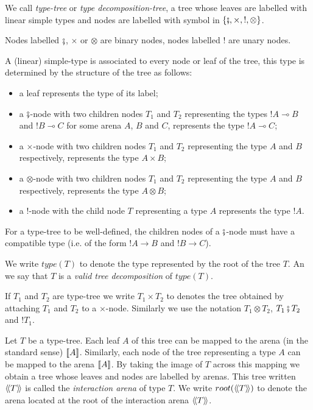 \begin{dfn}
We call \emph{type-tree} or \emph{type decomposition-tree}, a tree whose leaves are labelled with linear simple types
and nodes are labelled with symbol in  $\{ \fatsemi, \times, !, \otimes \}$.

Nodes labelled $\fatsemi$, $\times$ or $\otimes$ are binary nodes, nodes labelled $!$ are unary nodes.

A (linear) simple-type is associated to every node or leaf of the tree, this type is determined by the
structure of the tree as follows:
\begin{itemize}
\item a leaf represents the type of its label;
\item a $\fatsemi$-node with two children nodes $T_1$ and $T_2$ representing the types $!A\multimap B$
and $!B \multimap C$ for some arena $A$, $B$ and $C$, represents the type $!A \multimap C$;

\item a $\times$-node with two children nodes $T_1$ and $T_2$ representing the type $A$
and $B$ respectively, represents the type $A \times B$;

\item a $\otimes$-node with two children nodes $T_1$ and $T_2$ representing the type $A$
and $B$ respectively, represents the type $A\otimes B$;

\item a $!$-node with the child node $T$ representing a type $A$ represents the type $!A$.
\end{itemize}
For a type-tree to be well-defined, the children nodes of a $\fatsemi$-node must have a compatible type (i.e. of the form
$!A\rightarrow B$ and $!B\rightarrow C$).

We write $type(T)$ to denote the type represented by the root of the tree $T$. An we say that $T$ is a \emph{valid
tree decomposition} of $type(T)$.

If $T_1$ and $T_2$ are type-tree we write $T_1 \times T_2$ to denotes the tree obtained by attaching $T_1$ and $T_2$ to a $\times$-node.
Similarly we use the notation $T_1 \otimes T_2$, $T_1 \fatsemi T_2$ and $!T_1$.
\end{dfn}


Let $T$ be a type-tree. Each leaf $A$ of this tree can be mapped to the
arena (in the standard sense) ${[\![ A ]\!]}$. Similarly, each node of the tree representing a type $A$ can be mapped to
the arena ${[\![ A ]\!]}$. By taking the image of $T$ across this mapping we obtain a tree whose leaves and nodes are labelled by arenas.
This tree written ${\langle\!\langle T \rangle\!\rangle}$ is called the \emph{interaction arena} of type $T$.
We write $root({\langle\!\langle T \rangle\!\rangle})$ to denote the arena located at the root of the interaction arena ${\langle\!\langle T \rangle\!\rangle}$.

